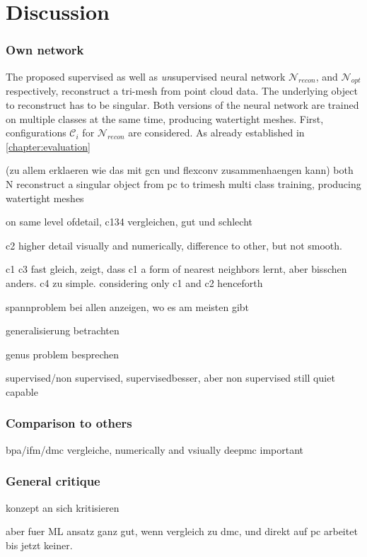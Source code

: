 \chapter{Discussion}
\label{sec:dicussion}
\subsection*{Own network}
The proposed supervised as well as \emph{un}supervised neural network $\mathcal{N}_{recon}$,
 and $\mathcal{N}_{opt}$ respectively, reconstruct a tri-mesh from point cloud data.
  The underlying object to reconstruct has to be singular. Both versions of the neural 
  network are trained on multiple classes at the same time, producing watertight meshes.
First, configurations $\mathcal{C}_i$ for $\mathcal{N}_{recon}$ are considered. As already
 established in \ref{chapter:evaluation}

 
(zu allem erklaeren wie das mit gcn und flexconv zusammenhaengen kann)
both N reconstruct a singular object from pc to trimesh
multi class training, producing watertight meshes

on same level ofdetail, c134 vergleichen, gut und schlecht

c2 higher detail visually and numerically, difference to other, but not smooth.

c1 c3 fast gleich, zeigt, dass c1 a form of nearest neighbors lernt, aber bisschen anders.
c4 zu simple. considering only c1 and c2 henceforth

spannproblem bei allen anzeigen, wo es am meisten gibt

generalisierung betrachten

genus problem besprechen

supervised/non supervised, supervisedbesser, aber non supervised still quiet capable
\subsection*{Comparison to others}
bpa/ifm/dmc vergleiche, numerically and vsiually
deepmc important
\subsection*{General critique}

konzept an sich kritisieren

aber fuer ML ansatz ganz gut, wenn vergleich zu dmc, und 
direkt auf pc arbeitet bis jetzt keiner.